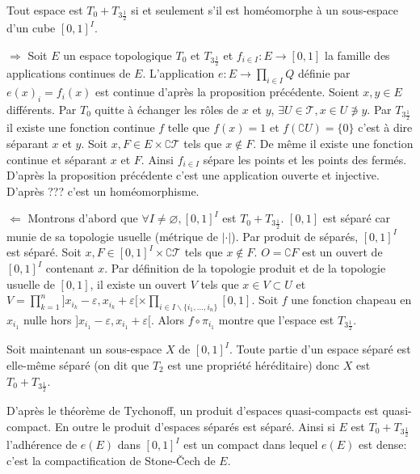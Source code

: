 \documentclass[a4paper, 11pt, french]{book}
\newenvironment{itemise}{\itemize}{\enditemize}
\theoremstyle{plain} %
\theoremstyle{definition} %
\theoremstyle{remark} %
\renewcommand{\setminus}{\backslash}
\newcommand{\1}{\mathds{1}}
\newcommand\vide{\varnothing}
\begin{document}
\proposition
Tout espace est $T_0+T_{3\frac{1}{2}}$ si et seulement s'il est homéomorphe à un sous-espace d'un cube $[0, 1]^I$.
\demonstration
\begin{itemise}
	\item[$\Rightarrow$] Soit $E$ un espace topologique $T_0$ et $T_{3\frac{1}{2}}$ et $f_{i\in I}:E\rightarrow [0, 1]$ la famille des applications continues de $E$.
	L'application $e:E\rightarrow \prod_{i\in I}Q$ définie par $e(x)_i=f_i(x)$ est continue d'après la proposition précédente.
	Soient $x, y\in E$ différents.
	Par $T_0$ quitte à échanger les rôles de $x$ et $y$, $\exists U\in\mathscr{T}, x\in U\not\ni y$.
	Par $T_{3\frac{1}{2}}$ il existe une fonction continue $f$ telle que $f(x)=1$ et $f(\complement U)=\{0\}$ c'est à dire séparant $x$ et $y$.
	Soit $x, F\in E\times\complement\mathscr{T}$ tels que $x\notin F$.
	De même il existe une fonction continue et séparant $x$ et $F$.
	Ainsi $f_{i\in I}$ sépare les points et les points des fermés.
	D'après la proposition précédente c'est une application ouverte et injective.
	D'après {\color{red} ???} c'est un homéomorphisme.
	\item[$\Leftarrow$] Montrons d'abord que $\forall I\neq\vide, [0, 1]^I$ est $T_0+T_{3\frac{1}{2}}$.
	$[0, 1]$ est séparé car munie de sa topologie usuelle (métrique de $|\cdot|$).
	Par produit de séparés, $[0, 1]^I$ est séparé.
	Soit $x, F\in[0, 1]^I\times\complement\mathscr{T}$ tels que $x\notin F$.
	$O=\complement F$ est un ouvert de $[0, 1]^I$ contenant $x$.
	Par définition de la topologie produit et de la topologie usuelle de $[0, 1]$, il existe un ouvert $V$ tels que $x\in V\subset U$ et $V=\prod_{k=1}^n]x_{i_k}-\varepsilon, x_{i_k}+\varepsilon[\times\prod_{i\in I\setminus\{i_1, ..., i_n\}}[0, 1]$.
	Soit $f$ une fonction chapeau en $x_{i_1}$ nulle hors $]x_{i_1}-\varepsilon, x_{i_1}+\varepsilon[$.
	Alors $f\circ\pi_{i_1}$ montre que l'espace est $T_{3\frac{1}{2}}$.
	
	Soit maintenant un sous-espace $X$ de $[0, 1]^I$.
	Toute partie d'un espace séparé est elle-même séparé (on dit que $T_2$ est une propriété héréditaire) donc $X$ est $T_0+T_{3\frac{1}{2}}$.
\end{itemise}

\remarque
D'après le théorème de Tychonoff, un produit d'espaces quasi-compacts est quasi-compact.
En outre le produit d'espaces séparés est séparé.
Ainsi si $E$ est $T_0+T_{3\frac{1}{2}}$ l'adhérence de $e(E)$ dans $[0, 1]^I$ est un compact dans lequel $e(E)$ est dense: c'est la compactification de Stone-Čech de $E$.
\end{document}

